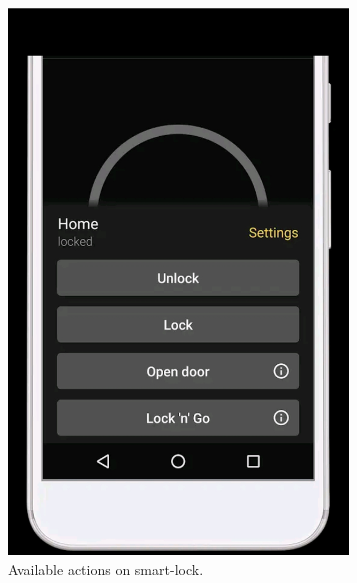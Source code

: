 \begin{figure}[ht]
\begin{subfigure}[b]{0.29\textwidth}
        \includegraphics[width=0.99\textwidth, frame]{figures/actionnukiapp.jpg}
        \caption{Available actions on smart-lock.}
        \label{fig:actionukiapp}
    \end{subfigure}
    \hfill
    \begin{subfigure}[b]{0.29\textwidth}
         \centering

\end{subfigure}
\end{figure}
